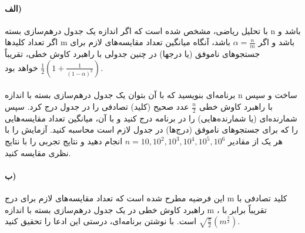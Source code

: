 \documentclass[]{article}
\begin{document}
\paragraph[3.1]{الف)}
با تحلیل ریاضی، مشخص شده است که اگر اندازه یک جدول درهم‌سازی بسته n باشد و اگر تعداد کلیدها m باشد
و اگر $\alpha = \frac{n}{m}$ باشد،
آنگاه میانگین تعداد مقایسه‌های لازم برای جستجوهای ناموفق (یا درجها) در چنین جدولی با راهبرد کاوش خطی، تقریباً
$\displaystyle \frac{1}{2}(1 + \frac{1}{(1-\alpha)^2})$ خواهد بود.

\paragraph[3.2]{}
برنامه‌ای بنویسید که با آن بتوان یک جدول درهم‌سازی بسته با اندازه n ساخت و سپس با راهبرد کاوش خطی
$\frac{n}{2}$ عدد صحیح (کلید) تصادفی را در جدول درج کرد. سپس شمارنده‌ای (یا شمارنده‌هایی) را در برنامه درج کنید
و با آن، میانگین تعداد مقایسه‌هایی را که برای جستجوهای ناموفق (درج‌ها) در جدول لازم است محاسبه کنید.
آزمایش را با هر یک از مقادیر $n = 10, 10^2, 10^3, 10^4, 10^5, 10^6$ انجام دهید و نتایج تجربی را با نتایج نظری مقایسه کنید. 

\paragraph[3.1]{ب)}
این فرضیه مطرح شده است که تعداد مقایسه‌های لازم برای درج m کلید تصادفی با راهبرد کاوش خطی در یک جدول
درهم‌سازی بسته با اندازه m ، تقریباً برابر با
$\displaystyle \sqrt{\frac{\pi}{2}}(m^{\frac{3}{2}})$ است.
با نوشتن برنامه‌ای، درستی این ادعا را تحقیق کنید.
\end{document}
